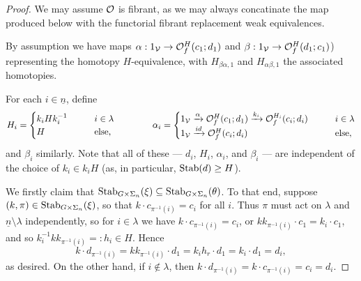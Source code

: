 \documentclass[a4paper,10pt
,draft
]{article}%
\renewcommand{\1}{\ensuremath{\mathbb{id}}}
\begin{document}
\begin{proof}
      We may assume $\mathcal{O}$ is fibrant, as we may always concatinate the map produced below with the functorial fibrant replacement weak equivalences.
      
      By assumption we have maps
      $\alpha: 1_{\mathcal V} \to \mathcal{O}^H_f(c_1;d_1)$ and $\beta: 1_{\mathcal V} \to \mathcal{O}^H_f(d_1;c_1)$)
      representing the homotopy $H$-equivalence,
      with $H_{\beta\alpha,1}$ and $H_{\alpha\beta,1}$ the associated homotopies.
      
      For each $i \in \underline{n}$, define
      \begin{equation}
            \label{WEAKEQCOLORS_EQ}
            H_i =
            \begin{cases}
                  k_i H k_i^{-1} \qquad & i \in \lambda
                  \\
                  H & \mbox{else,}
            \end{cases}
            \qquad
            \qquad 
            \alpha_i =
            \begin{cases}
                  1_{\mathcal V} \xrightarrow{\alpha} \mathcal{O}^H_f(c_1;d_1) \xrightarrow{k_i} \mathcal{O}^{H_i}_f(c_i;d_i) \qquad & i \in \lambda
                  \\
                  1_{\mathcal V} \xrightarrow{id} \mathcal{O}^H_f(c_i;d_i) & \mbox{else},
            \end{cases}
      \end{equation}
      and $\beta_i$ similarly.
      Note that all of these --- $d_i$, $H_i$, $\alpha_i$, and $\beta_i$ --- are independent of the choice of $k_i\in k_i H$
      (as, in particular, $\mathrm{Stab}(d) \geq H$).

      We firstly claim that $\mathrm{Stab}_{G \times \Sigma_n}(\xi) \subseteq \mathrm{Stab}_{G \times \Sigma_n}(\theta)$.
      To that end, suppose $(k,\pi)\in \mathrm{Stab}_{G\times \Sigma_n}(\xi)$, so that $k \cdot c_{\pi^{-1}(i)} = c_i$ for all $i$.
      Thus $\pi$ must act on $\lambda$ and $\underline{n} \setminus \lambda$ independently,
      so for $i \in \lambda$ we have $k \cdot c_{\pi^{-1}(i)} = c_i$, or
      $k k_{\pi^{-1}(i)} \cdot c_1 = k_i \cdot c_1$, and so
      $k_i^{-1} k k_{\pi^{-1}(i)} =:h_i \in H$. Hence 
      \begin{equation}
            k \cdot d_{\pi^{-1}(i)} = k k_{\pi^{-1}(i)} \cdot d_1 = k_i h_r \cdot d_1 = k_i \cdot d_1 = d_i,
      \end{equation}
      as desired.
      On the other hand, if $i \not \in \lambda$, then
      $k \cdot d_{\pi^{-1}(i)} = k \cdot c_{\pi^{-1}(i)} = c_i = d_i$.
      

\end{proof}
\end{document}

